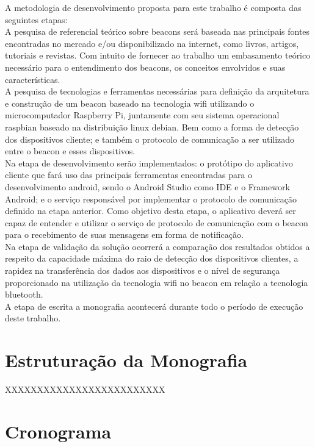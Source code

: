 A metodologia de desenvolvimento proposta para este trabalho é composta das seguintes etapas: \\
\indent A pesquisa de referencial teórico sobre beacons será baseada nas principais fontes encontradas no mercado e/ou disponibilizado na internet, como livros, artigos, tutoriais e revistas. Com intuito de fornecer ao trabalho um embasamento teórico necessário para o entendimento dos beacons, os conceitos envolvidos e suas características. \\
\indent A pesquisa de tecnologias e ferramentas necessárias para definição da arquitetura e construção de um beacon baseado na tecnologia wifi utilizando o microcomputador Raspberry Pi, juntamente com seu sistema operacional raspbian baseado na distribuição linux debian. Bem como a forma de detecção dos dispositivos cliente; e também o protocolo de comunicação a ser utilizado entre o beacon e esses dispositivos. \\
\indent Na etapa de desenvolvimento serão implementados: o protótipo do aplicativo cliente que fará uso das principais ferramentas encontradas para o desenvolvimento android, sendo o Android Studio como IDE e o Framework Android; e o serviço responsável por implementar o protocolo de comunicação definido na etapa anterior. Como objetivo desta etapa, o aplicativo deverá ser capaz de entender e utilizar o serviço de protocolo de comunicação com o beacon para o recebimento de suas mensagens em forma de notificação. \\
\indent Na etapa de validação da solução ocorrerá a comparação dos resultados obtidos a respeito da capacidade máxima do raio de detecção dos dispositivos clientes, a rapidez na transferência dos dados aos dispositivos e o nível de segurança proporcionado na utilização da tecnologia wifi no beacon em relação a tecnologia bluetooth. \\
\indent A etapa de escrita a monografia acontecerá durante todo o período de execução deste trabalho.

\section{Estruturação da Monografia}
\label{sec:estruturacao-monografia}

XXXXXXXXXXXXXXXXXXXXXXXXX

\section{Cronograma}
\label{sec:cronograma}

\begin{figure}[h!]
	\centering
\end{figure}